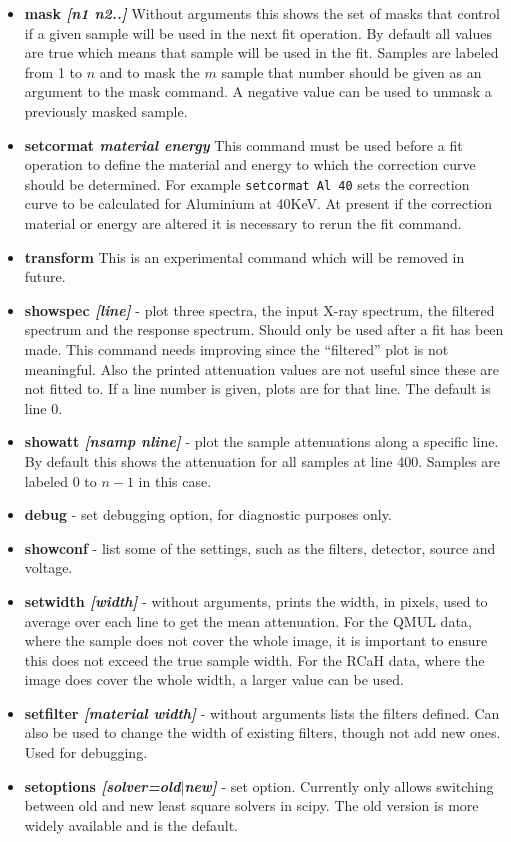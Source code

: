 \documentclass[a4paper,12pt]{article}
\begin{document}
\begin{itemize}
\item{\bf mask \it{[n1 n2..]}} Without arguments this shows the set of masks that control if a given sample will be used in the next fit operation.
By default all values are true which means that sample will be used in the fit. Samples are labeled from 1 to $n$ and to mask the $m$ sample
that number should be given as an argument to the mask command. A negative value can be used to unmask a previously masked sample.

\item{\bf setcormat \it{material energy}} This command must be used before a fit operation to define the material and energy to which the correction
curve should be determined. For example \texttt{setcormat Al 40} sets the correction curve to be calculated for Aluminium at 40KeV.
At present if the correction material or energy are altered it is necessary to rerun the fit command.

\item{\bf transform} This is an experimental command which will be removed in future.

\item{\bf showspec \it{[line]}} - plot three spectra, the input X-ray spectrum, the filtered spectrum and the response spectrum.
Should only be used after a fit has been made. This command needs improving since the ``filtered'' plot is not meaningful.
Also the printed attenuation values are not useful since these are not fitted to.
If a line number is given, plots are for that line. The default is line 0.

\item{\bf showatt \it[nsamp nline]} - plot the sample attenuations along a specific line. By default this shows the
attenuation for all samples at line 400. Samples are labeled 0 to $n-1$ in this case.

\item{\bf debug} - set debugging option, for diagnostic purposes only.

\item{\bf showconf} - list some of the settings, such as the filters, detector, source and voltage.

\item{\bf setwidth \it[width]} - without arguments, prints the width, in pixels, used to average over each line to get the mean
attenuation. For the QMUL data, where the sample does not cover the whole image, it is important to ensure this does not
exceed the true sample width. For the RCaH data, where the image does cover the whole width, a larger value can be used.

\item{\bf setfilter \it[material width]} - without arguments lists the filters defined. Can also be used
to change the width of existing filters, though not add new ones. Used for debugging.

\item{\bf setoptions \it[solver=old$\vert$new]} - set option. Currently only allows switching
between old and new least square solvers in scipy. The old version is more widely available
and is the default.

\end{itemize}
\end{document}
